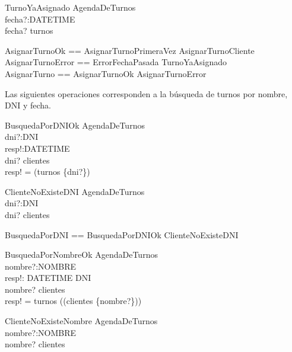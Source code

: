 \documentclass[%
  fleqn,colorlinks,linkcolor=blue,citecolor=blue,urlcolor=blue]{eptcs}
\DeclareMathOperator{\Ima}{Im}
\begin{document}
  \begin{schema}{TurnoYaAsignado}
  \Xi AgendaDeTurnos \\
  fecha?:DATETIME \\
  \where
  fecha? \in turnos
  \end{schema}

  \begin{zed}
  AsignarTurnoOk  == AsignarTurnoPrimeraVez \lor AsignarTurnoCliente \\
  AsignarTurnoError == ErrorFechaPasada \lor TurnoYaAsignado \\
  AsignarTurno == AsignarTurnoOk \lor AsignarTurnoError
  \end{zed}

  Las siguientes operaciones corresponden a la b\'usqueda de turnos por nombre, DNI y fecha.

  \begin{schema}{BusquedaPorDNIOk}
  \Xi AgendaDeTurnos \\
  dni?:DNI \\
  resp!:\power DATETIME \\
  \where
  dni? \in \dom clientes \\
  resp! = \dom(turnos \dres \{dni?\})
  \end{schema}

  \begin{schema}{ClienteNoExisteDNI}
  \Xi AgendaDeTurnos \\
  dni?:DNI \\
  \where
  dni? \notin \dom clientes
  \end{schema}

  \begin{zed}
  BusquedaPorDNI == BusquedaPorDNIOk \lor ClienteNoExisteDNI
  \end{zed}

  \begin{schema}{BusquedaPorNombreOk}
  \Xi AgendaDeTurnos \\
  nombre?:NOMBRE \\
  resp!: DATETIME \pfun DNI \\
  \where
  nombre? \in \ran clientes \\
  resp! = turnos \rres (\dom (clientes \rres \{nombre?\}))
  \end{schema}

  \begin{schema}{ClienteNoExisteNombre}
  \Xi AgendaDeTurnos \\
  nombre?:NOMBRE \\
  \where
  nombre? \notin \Ima clientes
  \end{schema}
\end{document}
